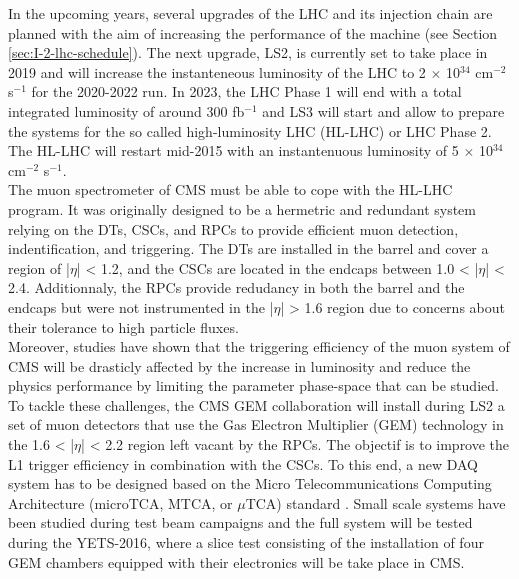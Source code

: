 In the upcoming years, several upgrades of the LHC and its injection chain are planned with the aim of increasing the performance of the machine (see Section \ref{sec:I-2-lhc-schedule}). The next upgrade, LS2, is currently set to take place in 2019 and will increase the instanteneous luminosity of the LHC to 2 $ \times $ 10$^{34}$ cm$^{-2}$ s$^{-1}$ for the 2020-2022 run. In 2023, the LHC Phase 1 will end with a total integrated luminosity of around 300 fb$^{-1}$ and LS3 will start and allow to prepare the systems for the so called high-luminosity LHC (HL-LHC) or LHC Phase 2. The HL-LHC will restart mid-2015 with an instantenuous luminosity of 5 $ \times $ 10$^{34}$ cm$^{-2}$ s$^{-1}$. \\

The muon spectrometer of CMS must be able to cope with the HL-LHC program. It was originally designed to be a hermetric and redundant system relying on the DTs, CSCs, and RPCs to provide efficient muon detection, indentification, and triggering. The DTs are installed in the barrel and cover a region of |$\eta$| < 1.2, and the CSCs are located in the endcaps between 1.0 < |$\eta$| < 2.4. Additionnaly, the RPCs provide redudancy in both the barrel and the endcaps but were not instrumented in the |$\eta$| > 1.6 region due to concerns about their tolerance to high particle fluxes. \\

Moreover, studies have shown that the triggering efficiency of the muon system of CMS will be drasticly affected by the increase in luminosity and reduce the physics performance by limiting the parameter phase-space that can be studied. \\

To tackle these challenges, the CMS GEM collaboration \cite{Colaleo:2021453} will install during LS2 a set of muon detectors that use the Gas Electron Multiplier (GEM) technology in the 1.6 < |$\eta$| < 2.2 region left vacant by the RPCs. The objectif is to improve the L1 trigger efficiency in combination with the CSCs. To this end, a new DAQ system has to be designed based on the Micro Telecommunications Computing Architecture (microTCA, MTCA, or $\mu$TCA) standard \cite{PICMG}. Small scale systems have been studied during test beam campaigns and the full system will be tested during the YETS-2016, where a slice test consisting of the installation of four GEM chambers equipped with their electronics will be take place in CMS. \\

